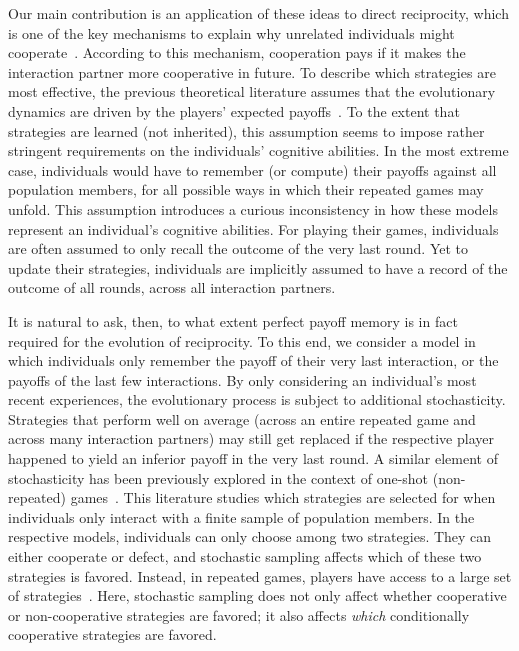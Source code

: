 \documentclass[11pt]{article}
\theoremstyle{plainCl1}
\theoremstyle{plainCl2}
\begin{document}
Our main contribution is an application of these ideas to direct reciprocity, which is one of the key mechanisms to explain why unrelated individuals might cooperate~\citep{nowak:Science:2006}. 
According to this mechanism, cooperation pays if it makes the interaction partner more cooperative in future. 
To describe which strategies are most effective, the previous theoretical literature assumes that the evolutionary dynamics are driven by the players' expected payoffs~\citep{brauchli:JTB:1999,brandt:JTB:2006,ohtsuki:JTB:2007b,szolnoki:pre:2009b,imhof2010stochastic,vansegbroeck:prl:2012,grujic:jtb:2012,Martinez2012,stewart:pnas:2013,pinheiro:PLoSCB:2014,stewart:games:2015,Baek2016,McAvoy:ProcA:2019,glynatsi:SCR:2020,Schmid:PlosCB:2022,Murase:SciRep:2022}.
To the extent that strategies are learned (not inherited), this assumption seems to impose rather stringent requirements on the individuals' cognitive abilities. 
In the most extreme case, individuals would have to remember (or compute) their payoffs against all population members, for all possible ways in which their repeated games may unfold. 
This assumption introduces a curious inconsistency in how these models represent an individual's cognitive abilities. 
For playing their games, individuals are often assumed to only recall the outcome of the very last round. 
Yet to update their strategies, individuals are implicitly assumed to have a record of the outcome of all rounds, across all interaction partners. 

It is natural to ask, then, to what extent perfect payoff memory is in fact required for the evolution of reciprocity. 
To this end, we consider a model in which individuals only remember the payoff of their very last interaction, or the payoffs of the last few interactions. 
By only considering an individual's most recent experiences, the evolutionary process is subject to additional stochasticity. 
Strategies that perform well on average (across an entire repeated game and across many interaction partners) may still get replaced if the respective player happened to yield an inferior payoff in the very last round. 
A similar element of stochasticity has been previously explored in the context of one-shot (non-repeated) games~\citep{sanchez:JTB:2005,roca:PhysicalReview:2006,Traulsen:JTB:2007,Woelfing:JTB:2009,Hauert:PRE:2018}. 
This literature studies which strategies are selected for when individuals only interact with a finite sample of population members. 
In the respective models, individuals can only choose among two strategies. 
They can either cooperate or defect, and stochastic sampling affects which of these two strategies is favored. 
Instead, in repeated games, players have access to a large set of strategies~\citep[in our case, all reactive strategies;][]{nowak:APC:1989}. 
Here, stochastic sampling does not only affect whether cooperative or non-cooperative strategies are favored; it also affects {\it which} conditionally cooperative strategies are favored. 
\end{document}
